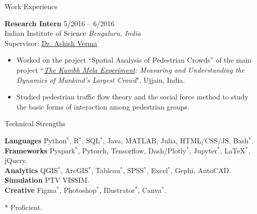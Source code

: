 \documentclass{CV} %
\begin{document}
\begin{rSection}{Work Experience}
\begin{itemize}[noitemsep]
    \end{itemize}
    {\bf Research Intern} \hfill {5/2016 – 6/2016}
    \\ Indian Institute of Science \hfill {\em Bengaluru, India}
    \\ Supervisor: \href{http://civil.iisc.ernet.in/~ashishv/}{Dr. Ashish Verma}
    \begin{itemize}[noitemsep]
        \item Worked on the project ``Spatial Analysis of Pedestrian Crowds” of the main project ``\textit{\href{http://www.the-kumbh-mela-experiment.com/}{The Kumbh Mela Experiment}: Measuring and Understanding the Dynamics of Mankind’s Largest Crowd}", Ujjain, India.
        \item Studied pedestrian traffic flow theory and the social force method to study the basic forms of interaction among pedestrian groups.
    \end{itemize}
\end{rSection}

\begin{rSection}{Technical Strengths}
    \begin{tabbing}
    \textbf{Languages} \hspace*{0.5cm} \= Python$^*$, R$^*$, SQL$^*$, Java, MATLAB, Julia, HTML/CSS/JS, Bash$^*$.
    \\ \textbf{Frameworks} \> Pyspark$^*$, Pytorch, Tensorflow, Dash/Plotly$^*$, Jupyter$^*$, LaTeX$^*$, jQuery.
    \\ \textbf{Analytics} \> QGIS$^*$, ArcGIS$^*$, Tableau$^*$, SPSS$^*$, Excel$^*$, Gephi, AutoCAD.
    \\ \textbf{Simulation} \> PTV VISSIM.
    \\ \textbf{Creative} \> Figma$^*$, Photoshop$^*$, Illustrator$^*$, Canva$^*$.
    \end{tabbing}
    * Proficient.
\end{rSection}
\end{document}

